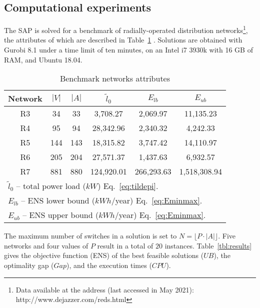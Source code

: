 \documentclass{article}
\begin{document}
\subsection{Computational experiments} \label{sec:Tests}

The SAP is solved for a benchmark of radially-operated distribution networks\footnote{Data available at the address (last accessed in May 2021): \\ http://www.dejazzer.com/reds.html}, the attributes of which are described in Table~\ref{tbl:networkAttributes} \cite{redes2013}. 
Solutions are obtained with Gurobi 8.1 under a time limit of ten minutes, on an Intel i7 3930k with 16 GB of RAM, and Ubuntu 18.04.


\begin{table}[ht!]
\caption{Benchmark networks attributes} 
\begin{center} {
\begin{tabular}{ c c c c c c } \label{tbl:networkAttributes}
\\
Network & $|V|$ & $|A|$ & $\tilde{l}_0$ & $E_{lb}$ & $E_{ub}$ \\ \hline
R3 & 34 & 33 & 3,708.27 & 2,069.97 & 11,135.23 \\ 
R4 & 95 & 94 & 28,342.96 & 2,340.32 & 4,242.33 \\ 
R5 & 144 & 143 & 18,315.82 & 3,747.42 & 14,110.97 \\ 
R6 & 205 & 204 & 27,571.37 & 1,437.63 & 6,932.57 \\ 
R7 & 881 & 880 & 124,920.01 & 266,293.63 & 1,518,308.94 \\ 
\hline 
\multicolumn{6}{l}{$\tilde{l}_0$ -- total power load ($kW$) Eq.~\eqref{eq:tildepi}.} \\
\multicolumn{6}{l}{$E_{lb}$ -- ENS lower bound ($kWh$/year) Eq.~\eqref{eq:Eminmax}.} \\
\multicolumn{6}{l}{$E_{ub}$ -- ENS upper bound ($kWh$/year) Eq.~\eqref{eq:Eminmax}.}  \\
\end{tabular} }
\end{center} \end{table}


The maximum number of switches in a solution is set to
$N = \lfloor P \cdot |A| \rfloor$. Five networks and four values of $P$ result in a total of $20$ instances. Table~\ref{tbl:results} gives the objective function (ENS) of the best feasible solutions ($UB$), the optimality gap ($Gap$), and the execution times ($CPU$).
\end{document}

